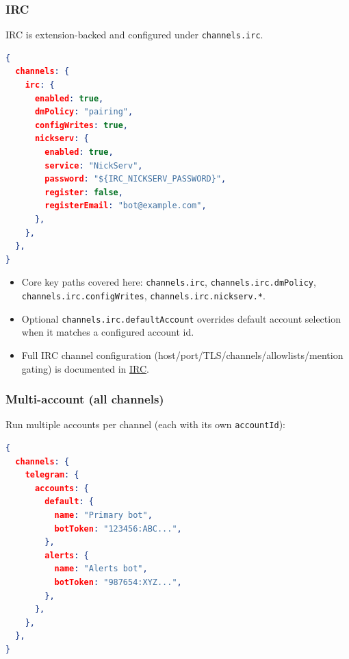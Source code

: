 \subsubsection{IRC}


IRC is extension-backed and configured under \texttt{channels.irc}.

\begin{lstlisting}[language=json]
{
  channels: {
    irc: {
      enabled: true,
      dmPolicy: "pairing",
      configWrites: true,
      nickserv: {
        enabled: true,
        service: "NickServ",
        password: "${IRC_NICKSERV_PASSWORD}",
        register: false,
        registerEmail: "bot@example.com",
      },
    },
  },
}
\end{lstlisting}


\begin{itemize}
  \item Core key paths covered here: \texttt{channels.irc}, \texttt{channels.irc.dmPolicy}, \texttt{channels.irc.configWrites}, \texttt{channels.irc.nickserv.*}.
  \item Optional \texttt{channels.irc.defaultAccount} overrides default account selection when it matches a configured account id.
  \item Full IRC channel configuration (host/port/TLS/channels/allowlists/mention gating) is documented in \href{/channels/irc}{IRC}.
\end{itemize}


\subsubsection{Multi-account (all channels)}


Run multiple accounts per channel (each with its own \texttt{accountId}):

\begin{lstlisting}[language=json]
{
  channels: {
    telegram: {
      accounts: {
        default: {
          name: "Primary bot",
          botToken: "123456:ABC...",
        },
        alerts: {
          name: "Alerts bot",
          botToken: "987654:XYZ...",
        },
      },
    },
  },
}
\end{lstlisting}


